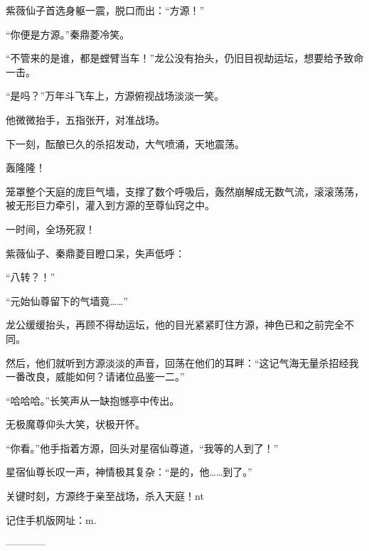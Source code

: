 \begin{this_body}
紫薇仙子首选身躯一震，脱口而出：“方源！”

“你便是方源。”秦鼎菱冷笑。

“不管来的是谁，都是螳臂当车！”龙公没有抬头，仍旧目视劫运坛，想要给予致命一击。

“是吗？”万年斗飞车上，方源俯视战场淡淡一笑。

他微微抬手，五指张开，对准战场。

下一刻，酝酿已久的杀招发动，大气喷涌，天地震荡。

轰隆隆！

笼罩整个天庭的庞巨气墙，支撑了数个呼吸后，轰然崩解成无数气流，滚滚荡荡，被无形巨力牵引，灌入到方源的至尊仙窍之中。

一时间，全场死寂！

紫薇仙子、秦鼎菱目瞪口呆，失声低呼：

“八转？！”

“元始仙尊留下的气墙竟……”

龙公缓缓抬头，再顾不得劫运坛，他的目光紧紧盯住方源，神色已和之前完全不同。

然后，他们就听到方源淡淡的声音，回荡在他们的耳畔：“这记气海无量杀招经我一番改良，威能如何？请诸位品鉴一二。”

“哈哈哈。”长笑声从一缺抱憾亭中传出。

无极魔尊仰头大笑，状极开怀。

“你看。”他手指着方源，回头对星宿仙尊道，“我等的人到了！”

星宿仙尊长叹一声，神情极其复杂：“是的，他……到了。”

关键时刻，方源终于亲至战场，杀入天庭！nt

记住手机版网址：m.

------------

\end{this_body}

